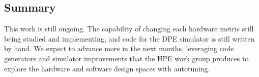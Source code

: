 
\subsection{Summary}
\label{subsec:DPEconcl}

This work is still ongoing. The capability of changing each hardware metric
still being studied and implementing, and code for the DPE simulator is still
written by hand. We expect to advance more in the next months, leveraging code
generators and simulator improvements that the HPE work group produces to
explore the hardware and software design spaces with autotuning.
